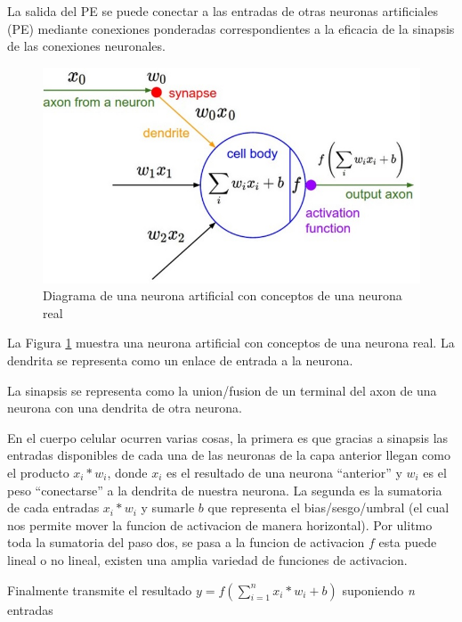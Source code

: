 \documentclass[runningheads]{llncs} %
\begin{document}
La salida del PE se puede conectar a las entradas de otras neuronas artificiales (PE)
mediante conexiones ponderadas correspondientes a la eficacia de la sinapsis de las
conexiones neuronales. \cite{libro-def}

\begin{figure}
    \centering
    \includegraphics[scale=0.6]{neurona_artificial2.png}
    \caption{Diagrama de una neurona artificial con conceptos de una neurona real \cite{img-neurona_artificial2}}
    \label{fig:neurona_artificial}
\end{figure}

La Figura \ref{fig:neurona_artificial} muestra una neurona artificial con conceptos
de una neurona real.
La dendrita se representa como un enlace de entrada a la neurona.

La sinapsis se representa como la union/fusion de un terminal del axon de una neurona
con una dendrita de otra neurona. 

En el cuerpo celular ocurren varias cosas, la primera es que gracias a sinapsis las
entradas disponibles de cada una de las neuronas de la capa anterior llegan como el 
producto \(x_{i}*w_{i}\), donde \(x_{i}\) es el resultado de una neurona 
\textquotedblleft{anterior}\textquotedblright{} y \(w_{i}\) es el peso 
\textquotedblleft{conectarse}\textquotedblright{} a la dendrita de nuestra neurona.
La segunda es la sumatoria de cada entradas \(x_{i}*w_{i}\) y sumarle
\(b\) que representa el bias/sesgo/umbral (el cual nos permite mover la funcion
de activacion de manera horizontal).
Por ulitmo toda la sumatoria del paso dos, se pasa a la funcion de activacion \(f\)
esta puede lineal o no lineal, existen una amplia variedad de funciones de activacion.

Finalmente transmite el resultado \(y = f(\sum_{i=1}^{n}{x_{i}*w_{i}} + b)\)
suponiendo \textit{n} entradas
\end{document}
